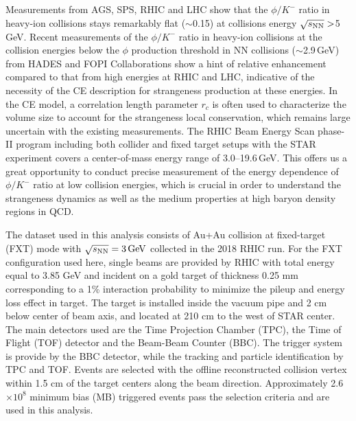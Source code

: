 \documentclass[%
 reprint,	
showpacs,
 amsmath,amssymb,
 aps,
 prc,
]{revtex4-1}
\begin{document}
Measurements from AGS, SPS, RHIC and LHC show that the $\phi/K^-$ ratio in heavy-ion collisions stays remarkably flat ($\sim$0.15) at collisions energy $\sqrt{s_{\rm NN}}>$5\,GeV. Recent measurements of the $\phi/K^-$ ratio in heavy-ion collisions at the collision energies below the $\phi$ production threshold in NN collisions ($\sim$2.9\,GeV) from HADES and FOPI Collaborations show a hint of relative enhancement compared to that from high energies at RHIC and LHC, %
indicative of the necessity of the CE description for strangeness production at these energies. In the CE model, a correlation length parameter $r_c$ is often used to characterize the volume size to account for the strangeness local conservation, which remains large uncertain with the existing measurements.
The RHIC Beam Energy Scan phase-II program including both collider and fixed target setups with the STAR experiment covers a center-of-mass energy range of 3.0--19.6\,GeV. This offers us a great opportunity to conduct precise measurement of the energy dependence of $\phi/K^-$ ratio at low collision energies, which is crucial in order to understand the strangeness dynamics as well as the medium properties at high baryon density regions in QCD.

The dataset used in this analysis consists of Au+Au collision at fixed-target (FXT) mode with ${\sqrt{s_{\rm NN}} = \rm{3\,GeV}}$ collected in the 2018 RHIC run. For the FXT configuration used here, single beams are provided by RHIC with total energy equal to 3.85 GeV and incident on a gold target of thickness 0.25 mm corresponding to a 1\% interaction probability to minimize the pileup and energy loss effect in target. The target is installed inside the vacuum pipe and 2 cm below center of beam axis, and located at 210 cm to the west of STAR center. The main detectors used are the Time Projection Chamber (TPC), the Time of Flight (TOF) detector and the Beam-Beam Counter (BBC). The trigger system is provide by the BBC detector, while the tracking and particle identification by TPC and TOF. Events are selected with the offline reconstructed collision vertex within 1.5 cm of the target centers along the beam direction. Approximately 2.6$\times 10^{8}$ minimum bias (MB) triggered events pass the selection criteria and are used in this analysis. 
\end{document}
